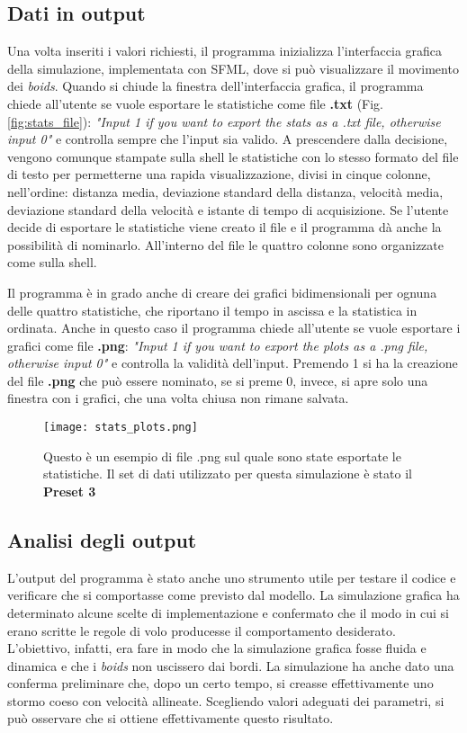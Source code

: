 \documentclass{article}
\begin{document}
\subsection{Dati in output}
Una volta inseriti i valori richiesti, il programma inizializza l'interfaccia 
grafica della simulazione, implementata con SFML, dove si può visualizzare il 
movimento dei \textit{boids}. Quando si chiude la finestra dell'interfaccia 
grafica, il programma chiede all'utente se vuole esportare le statistiche come 
file \textbf{.txt} (Fig.\ref{fig:stats_file}): \textit{"Input 1 if you want to 
export the stats as a .txt file, otherwise input 0"} e controlla sempre che 
l'input sia valido. A prescendere dalla decisione, vengono comunque stampate 
sulla shell le statistiche con lo stesso formato del file di testo per 
permetterne una rapida visualizzazione, divisi in cinque colonne, nell'ordine: 
distanza media, deviazione standard della distanza, velocità media, deviazione 
standard della velocità e istante di tempo di acquisizione. Se l'utente decide 
di esportare le statistiche viene creato il file e il programma dà anche la 
possibilità di nominarlo. All'interno del file le quattro colonne sono 
organizzate come sulla shell. 

Il programma è in grado anche di creare dei grafici bidimensionali per ognuna 
delle quattro statistiche, che riportano il tempo in ascissa e la statistica in 
ordinata. Anche in questo caso il programma chiede all'utente se vuole esportare
 i grafici come file \textbf{.png}: \textit{"Input 1 if you want to export the 
 plots as a .png file, otherwise input 0"} e controlla la validità dell'input. 
 Premendo 1 si ha la creazione del file \textbf{.png} che può essere nominato, 
 se si preme 0, invece, si apre solo una finestra con i grafici, che una volta 
 chiusa non rimane salvata. 
 \begin{figure}[h]
\centering 
\texttt{[image: stats\_plots.png]}
\caption{\label{fig:stats_plots}}Questo è un esempio di file .png sul quale sono
 state esportate le statistiche. Il set di dati utilizzato per questa 
 simulazione è stato il \textbf{Preset 3}
\end{figure}



\subsection{Analisi degli output}
\label{output_analys}

L'output del programma è stato anche uno strumento utile per testare il codice e
verificare che si comportasse come previsto dal modello. La simulazione grafica
ha determinato alcune scelte di implementazione e confermato che il modo in 
cui si erano scritte le regole di volo producesse il comportamento desiderato.
L'obiettivo, infatti, era fare in modo che la simulazione grafica fosse 
fluida e dinamica e che i \textit{boids} non uscissero dai bordi. La 
simulazione ha anche dato una conferma preliminare che, dopo un certo tempo, 
si creasse effettivamente uno stormo coeso con velocità allineate. Scegliendo
valori adeguati dei parametri, si può osservare che si ottiene 
effettivamente questo risultato. 
\end{document}
